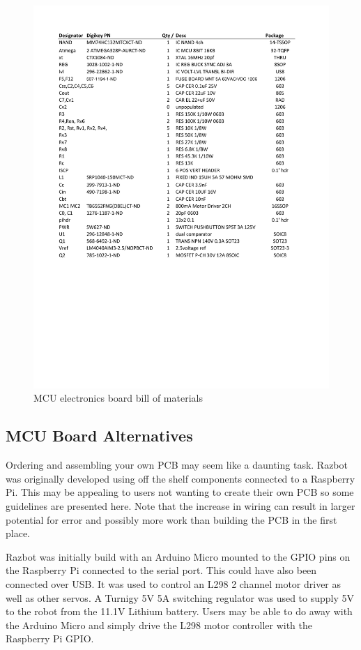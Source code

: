 \documentclass[12pt,titlepage,oneside]{memoir}
\begin{document}
\begin{figure}
\includegraphics[width=40pc]{hw/razbot_BOM.pdf}
\caption{MCU electronics board bill of materials}
\end{figure}

\subsection{MCU Board Alternatives}

Ordering and assembling your own PCB may seem like a daunting task. Razbot was originally developed using off the shelf components connected to a Raspberry Pi. This may be appealing to users not wanting to create their own PCB so some guidelines are presented here. Note that the increase in wiring can result in larger potential for error and possibly more work than building the PCB in the first place.

Razbot was initially build with an Arduino Micro mounted to the GPIO pins on the Raspberry Pi connected to the serial port. This could have also been connected over USB. It was used to control an L298 2 channel motor driver as well as other servos. A Turnigy 5V 5A switching regulator was used to supply 5V to the robot from the 11.1V Lithium battery. Users may be able to do away with the Arduino Micro and simply drive the L298 motor controller with the Raspberry Pi GPIO. 
\end{document}
